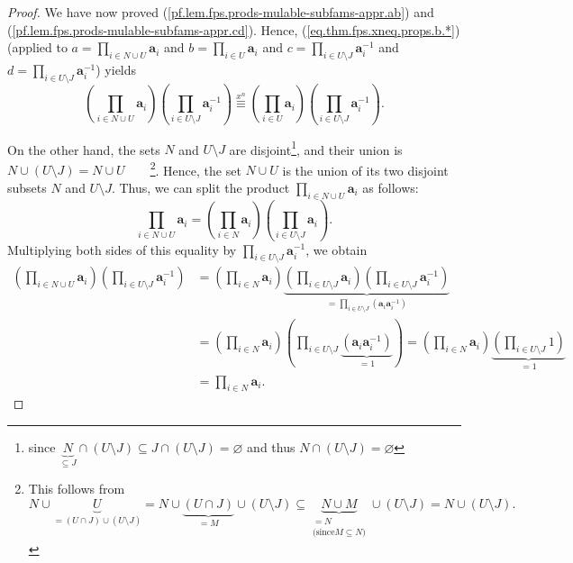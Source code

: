\begin{fineprint}
\begin{proof}
We have now proved (\ref{pf.lem.fps.prods-mulable-subfams-appr.ab}) and
(\ref{pf.lem.fps.prods-mulable-subfams-appr.cd}). Hence,
(\ref{eq.thm.fps.xneq.props.b.*}) (applied to $a=\prod_{i\in N\cup
U}\mathbf{a}_{i}$ and $b=\prod_{i\in U}\mathbf{a}_{i}$ and $c=\prod_{i\in
U\setminus J}\mathbf{a}_{i}^{-1}$ and $d=\prod_{i\in U\setminus J}%
\mathbf{a}_{i}^{-1}$) yields%
\begin{equation}
\left(  \prod_{i\in N\cup U}\mathbf{a}_{i}\right)  \left(  \prod_{i\in
U\setminus J}\mathbf{a}_{i}^{-1}\right)  \overset{x^{n}}{\equiv}\left(
\prod_{i\in U}\mathbf{a}_{i}\right)  \left(  \prod_{i\in U\setminus
J}\mathbf{a}_{i}^{-1}\right)  .
\label{pf.lem.fps.prods-mulable-subfams-appr.ac=bd}%
\end{equation}


On the other hand, the sets $N$ and $U\setminus J$ are disjoint\footnote{since
$\underbrace{N}_{\subseteq J}\cap\left(  U\setminus J\right)  \subseteq
J\cap\left(  U\setminus J\right)  =\varnothing$ and thus $N\cap\left(
U\setminus J\right)  =\varnothing$}, and their union is $N\cup\left(
U\setminus J\right)  =N\cup U$\ \ \ \ \footnote{This follows from%
\[
N\cup\underbrace{U}_{=\left(  U\cap J\right)  \cup\left(  U\setminus J\right)
}=N\cup\underbrace{\left(  U\cap J\right)  }_{=M}\cup\left(  U\setminus
J\right)  \subseteq\underbrace{N\cup M}_{\substack{=N\\\text{(since
}M\subseteq N\text{)}}}\cup\left(  U\setminus J\right)  =N\cup\left(
U\setminus J\right)  .
\]
}. Hence, the set $N\cup U$ is the union of its two disjoint subsets $N$ and
$U\setminus J$. Thus, we can split the product $\prod_{i\in N\cup U}%
\mathbf{a}_{i}$ as follows:%
\[
\prod_{i\in N\cup U}\mathbf{a}_{i}=\left(  \prod_{i\in N}\mathbf{a}%
_{i}\right)  \left(  \prod_{i\in U\setminus J}\mathbf{a}_{i}\right)  .
\]
Multiplying both sides of this equality by $\prod_{i\in U\setminus
J}\mathbf{a}_{i}^{-1}$, we obtain%
\begin{align}
\left(  \prod_{i\in N\cup U}\mathbf{a}_{i}\right)  \left(  \prod_{i\in
U\setminus J}\mathbf{a}_{i}^{-1}\right)   &  =\left(  \prod_{i\in N}%
\mathbf{a}_{i}\right)  \underbrace{\left(  \prod_{i\in U\setminus J}%
\mathbf{a}_{i}\right)  \left(  \prod_{i\in U\setminus J}\mathbf{a}_{i}%
^{-1}\right)  }_{=\prod_{i\in U\setminus J}\left(  \mathbf{a}_{i}%
\mathbf{a}_{i}^{-1}\right)  }\nonumber\\
&  =\left(  \prod_{i\in N}\mathbf{a}_{i}\right)  \left(  \prod_{i\in
U\setminus J}\underbrace{\left(  \mathbf{a}_{i}\mathbf{a}_{i}^{-1}\right)
}_{=1}\right)  =\left(  \prod_{i\in N}\mathbf{a}_{i}\right)
\underbrace{\left(  \prod_{i\in U\setminus J}1\right)  }_{=1}\nonumber\\
&  =\prod_{i\in N}\mathbf{a}_{i}. \label{pf.prop.fps.prods-mulable-subfams.7a}%
\end{align}



\end{proof}
\end{fineprint}
